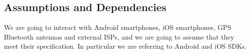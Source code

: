 \subsection{Assumptions and Dependencies}
We are going to interact with Android smartphones, iOS smartphones, GPS Bluetooth antennas and external ISPs, and we are going to assume that they meet their specification.
In particular we are referring to Android and iOS SDKs.
